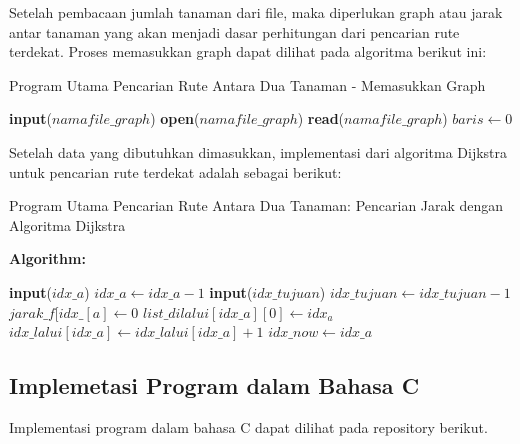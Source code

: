\documentclass[conference]{IEEEtran}
\begin{document}
	Setelah pembacaan jumlah tanaman dari file, maka diperlukan graph atau jarak antar tanaman yang akan menjadi dasar perhitungan dari pencarian rute terdekat. Proses memasukkan graph dapat dilihat pada algoritma berikut ini:
\begin{algorithm}
\caption{Program Utama Pencarian Rute Antara Dua Tanaman - Memasukkan Graph}\label{alg:five}
\textbf{input}($namafile\_graph$)\;
\textbf{open}($namafile\_graph$)\;
\textbf{read}($namafile\_graph$)\;
$baris \gets 0$\;
\end{algorithm}
\newpage
	Setelah data yang dibutuhkan dimasukkan, implementasi dari algoritma Dijkstra untuk pencarian rute terdekat adalah sebagai berikut:
\begin{algorithm}
\caption{Program Utama Pencarian Rute Antara Dua Tanaman: Pencarian Jarak dengan Algoritma Dijkstra}\label{alg:six}
\textbf{Algorithm:}

\textbf{input}($idx\_a$)\;
$idx\_a \gets idx\_a-1$\;
\textbf{input}($idx\_tujuan$)\;
$idx\_tujuan \gets idx\_tujuan-1$\;
$jarak\_f[idx\_[a] \gets 0$\;
$list\_dilalui[idx\_a] [0] \gets idx_a$\;
$idx\_lalui[idx\_a] \gets idx\_lalui[idx\_a]+1$\;
$idx\_now \gets idx\_a$\;
\end{algorithm}
\newpage
\subsection{Implemetasi Program dalam Bahasa C}
	Implementasi program dalam bahasa C dapat dilihat pada repository berikut.
\end{document}
